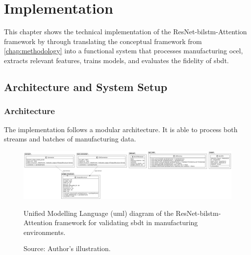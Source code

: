 \chapter{Implementation}
\label{chap:implementation}
This chapter shows the technical implementation of the ResNet-\gls{bilstm}-Attention framework by \textcite{Fischer2025ResNetBiLSTM} through translating the conceptual framework from \autoref{chap:methodology} into a functional system that processes manufacturing \gls{ocel}, extracts relevant features, trains models, and evaluates the fidelity of \gls{sbdt}.

\section{Architecture and System Setup}

\subsection{Architecture}
The implementation follows a modular architecture. It is able to process both streams and batches of manufacturing data.

\begin{figure}[htbp]
  \centering
  \includegraphics[width=1\textwidth]{figures/code.png}
  \caption[UML Diagram of the Implementation]{Unified Modelling Language (\gls{uml}) diagram of the ResNet-\gls{bilstm}-Attention framework for validating \gls{sbdt} in manufacturing environments.}
  \caption*{Source: Author's illustration.}
  \label{fig:uml-diagram}
\end{figure}

